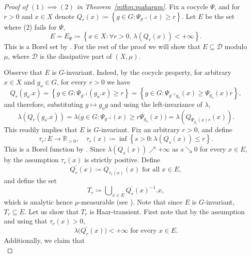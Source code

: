 \documentclass{amsart}
\numberwithin{equation}{subsection}
\begin{document}
\begin{proof}[Proof of \(\left(1\right)\implies\left(2\right)\) in Theorem~\ref{mthm:maharam}]
Fix a cocycle \(\Psi\), and for \(r>0\) and \(x\in X\) denote \(Q_{r}\left(x\right)\coloneqq\left\{ g\in G:\Psi_{g^{-1}}\left(x\right)\geq r\right\}\). Let \(E\) be the set where (2) fails for \(\Psi\),
\[E=E_{\Psi}\coloneqq\left\{ x\in X:\forall r>0,\,\lambda\left(Q_{r}\left(x\right)\right)<+\infty\right\}.\]
This is a Borel set by \cite[Theorem (17.25)]{kechris2012descriptive}. For the rest of the proof we will show that \(E\subseteq\mathcal{D}\) modulo \(\mu\), where \(\mathcal{D}\) is the dissipative part of \(\left(X,\mu\right)\).

Observe that \(E\) is \(G\)-invariant. Indeed, by the cocycle property, for arbitrary \(x\in X\) and \(g_{o}\in G\), for every \(r>0\) we have
\[Q_{r}\left(g_{o}.x\right)=\left\{ g\in G:\Psi_{g^{-1}}\left(g_{o}.x\right)\geq r\right\} =\left\{ g\in G:\Psi_{g^{-1}g_{o}}\left(x\right)\geq \Psi_{g_{o}}\left(x\right)r\right\},\]
and therefore, substituting \(g\mapsto g_{o}g\) and using the left-invariance of \(\lambda\),
\[\lambda\left(Q_{r}\left(g_{o}.x\right)\right)=\lambda\big(g\in G:\Psi_{g^{-1}}\left(x\right)\geq r\Psi_{g_{o}}\left(x\right)\big)=\lambda\left(Q_{\Psi_{g_{o}}\left(x\right)r}\left(x\right)\right).\]
This readily implies that \(E\) is \(G\)-invariant. Fix an arbitrary \(r>0\), and define
\[\tau_{r}:E\to\mathbb{R}_{>0},\quad\tau_{r}\left(x\right)\coloneqq\inf\left\{s>0:\lambda\left(Q_{s}\left(x\right)\right)\leq r\right\}.\]
This is a Borel function by \cite[Theorem (17.25)]{kechris2012descriptive}. Since \(\lambda\left(Q_{s}\left(x\right)\right)\nearrow+\infty\) as \(s\searrow 0\) for every \(x\in E\), by the assumption \(\tau_{r}\left(x\right)\) is strictly positive. Define
\[Q_{r}^{\prime}\left(x\right)\coloneqq Q_{\tau_{r}\left(x\right)}\left(x\right)\text{ for all }x\in E,\]
and define the set
\[T_{r}\coloneqq\bigcup\nolimits_{x\in E}Q_{r}^{\prime}\left(x\right)^{-1}.x,\]
which is analytic hence \(\mu\)-measurable (see \cite[Theorem (21.10)]{kechris2012descriptive}). Note that since \(E\) is \(G\)-invariant, \(T_{r}\subseteq E\). Let us show that \(T_{r}\) is Haar-transient. First note that by the assumption and using that \(\tau_{r}\left(x\right)>0\),
\begin{equation}
\label{eq:dprop}
\lambda\big(Q_{r}^{\prime}\left(x\right)\big)<+\infty\text{ for every }x\in E.
\end{equation}
Additionally, we claim that
\begin{equation}

\end{equation}
\end{proof}
\end{document}
